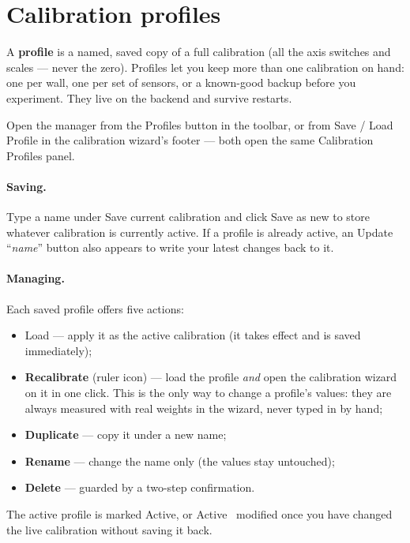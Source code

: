 \documentclass[11pt,a4paper]{article}
\begin{document}
\section{Calibration profiles}
\label{sec:profiles}

A \textbf{profile} is a named, saved copy of a full calibration (all the axis
switches and scales --- never the zero). Profiles let you keep more than one
calibration on hand: one per wall, one per set of sensors, or a known-good backup
before you experiment. They live on the backend and survive restarts.

Open the manager from the \textsf{Profiles} button in the toolbar, or from
\textsf{Save / Load Profile} in the calibration wizard's footer --- both open the
same \textsf{Calibration Profiles} panel.


\paragraph{Saving.} Type a name under \textsf{Save current calibration} and click
\textsf{Save as new} to store whatever calibration is currently active. If a profile
is already active, an \textsf{Update ``\emph{name}''} button also appears to write
your latest changes back to it.

\paragraph{Managing.} Each saved profile offers five actions:
\begin{itemize}[leftmargin=1.4em]
  \item \textsf{Load} --- apply it as the active calibration (it takes effect and is
        saved immediately);
  \item \textbf{Recalibrate} (ruler icon) --- load the profile \emph{and} open the
        calibration wizard on it in one click. This is the only way to change a
        profile's values: they are always measured with real weights in the wizard,
        never typed in by hand;
  \item \textbf{Duplicate} --- copy it under a new name;
  \item \textbf{Rename} --- change the name only (the values stay untouched);
  \item \textbf{Delete} --- guarded by a two-step confirmation.
\end{itemize}
The active profile is marked \textsf{Active}, or \textsf{Active \textperiodcentered\
modified} once you have changed the live calibration without saving it back.
\end{document}
